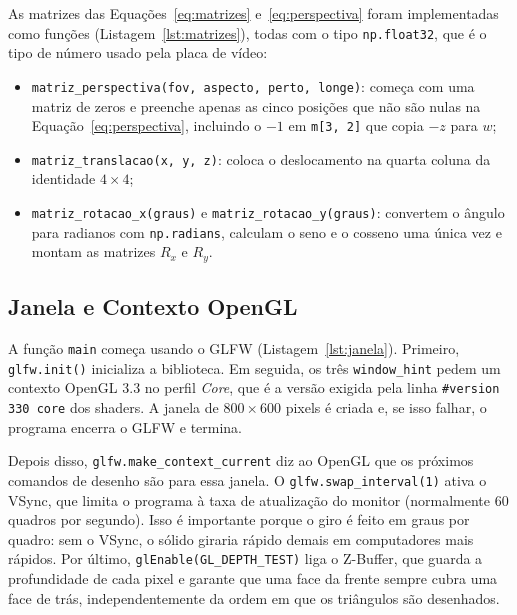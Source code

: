 \documentclass{article}
\begin{document}
As matrizes das Equações~\ref{eq:matrizes} e~\ref{eq:perspectiva} foram implementadas como funções (Listagem~\ref{lst:matrizes}), todas com o tipo \texttt{np.float32}, que é o tipo de número usado pela placa de vídeo:

\begin{itemize}
    \item \texttt{matriz\_perspectiva(fov, aspecto, perto, longe)}: começa com uma matriz de zeros e preenche apenas as cinco posições que não são nulas na Equação~\ref{eq:perspectiva}, incluindo o $-1$ em \texttt{m[3, 2]} que copia $-z$ para $w$;
    \item \texttt{matriz\_translacao(x, y, z)}: coloca o deslocamento na quarta coluna da identidade $4\times4$;
    \item \texttt{matriz\_rotacao\_x(graus)} e \texttt{matriz\_rotacao\_y(graus)}: convertem o ângulo para radianos com \texttt{np.radians}, calculam o seno e o cosseno uma única vez e montam as matrizes $R_x$ e $R_y$.
\end{itemize}



\subsection{Janela e Contexto OpenGL}

A função \texttt{main} começa usando o GLFW (Listagem~\ref{lst:janela}). Primeiro, \texttt{glfw.init()} inicializa a biblioteca. Em seguida, os três \texttt{window\_hint} pedem um contexto OpenGL 3.3 no perfil \textit{Core}, que é a versão exigida pela linha \texttt{\#version 330 core} dos shaders. A janela de $800\times600$ pixels é criada e, se isso falhar, o programa encerra o GLFW e termina.

Depois disso, \texttt{glfw.make\_context\_current} diz ao OpenGL que os próximos comandos de desenho são para essa janela. O \texttt{glfw.swap\_interval(1)} ativa o VSync, que limita o programa à taxa de atualização do monitor (normalmente 60 quadros por segundo). Isso é importante porque o giro é feito em graus por quadro: sem o VSync, o sólido giraria rápido demais em computadores mais rápidos. Por último, \texttt{glEnable(GL\_DEPTH\_TEST)} liga o Z-Buffer, que guarda a profundidade de cada pixel e garante que uma face da frente sempre cubra uma face de trás, independentemente da ordem em que os triângulos são desenhados.
\end{document}
